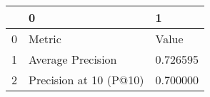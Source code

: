 \begin{tabular}{lll}
\toprule
 & 0 & 1 \\
\midrule
0 & Metric & Value \\
1 & Average Precision & 0.726595 \\
2 & Precision at 10 (P@10) & 0.700000 \\
\bottomrule
\end{tabular}
